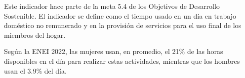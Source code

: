 Este indicador hace parte de la meta 5.4 de los Objetivos de Desarrollo Sostenible. El indicador se define como el tiempo usado en un día en trabajo doméstico no remunerado y en la provisión de servicios para el uso final de los miembros del hogar.

Según la ENEI 2022, las mujeres usan, en promedio, el 21\% de las horas disponibles en el día para realizar estas actividades, mientras que los hombres usan el 3.9\% del día.